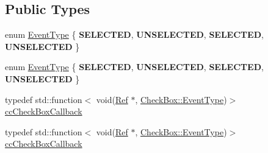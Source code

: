 \subsection*{Public Types}
\begin{DoxyCompactItemize}
\item 
enum \hyperlink{classui_1_1CheckBox_a72686e7bedf29fe84c5bc952be237b50}{Event\+Type} \{ {\bfseries S\+E\+L\+E\+C\+T\+ED}, 
{\bfseries U\+N\+S\+E\+L\+E\+C\+T\+ED}, 
{\bfseries S\+E\+L\+E\+C\+T\+ED}, 
{\bfseries U\+N\+S\+E\+L\+E\+C\+T\+ED}
 \}
\item 
enum \hyperlink{classui_1_1CheckBox_a72686e7bedf29fe84c5bc952be237b50}{Event\+Type} \{ {\bfseries S\+E\+L\+E\+C\+T\+ED}, 
{\bfseries U\+N\+S\+E\+L\+E\+C\+T\+ED}, 
{\bfseries S\+E\+L\+E\+C\+T\+ED}, 
{\bfseries U\+N\+S\+E\+L\+E\+C\+T\+ED}
 \}
\item 
typedef std\+::function$<$ void(\hyperlink{classRef}{Ref} $\ast$, \hyperlink{classui_1_1CheckBox_a72686e7bedf29fe84c5bc952be237b50}{Check\+Box\+::\+Event\+Type})$>$ \hyperlink{classui_1_1CheckBox_ad210762967d1b444f5cf94f5e7450c56}{cc\+Check\+Box\+Callback}
\item 
typedef std\+::function$<$ void(\hyperlink{classRef}{Ref} $\ast$, \hyperlink{classui_1_1CheckBox_a72686e7bedf29fe84c5bc952be237b50}{Check\+Box\+::\+Event\+Type})$>$ \hyperlink{classui_1_1CheckBox_ad210762967d1b444f5cf94f5e7450c56}{cc\+Check\+Box\+Callback}
\end{DoxyCompactItemize}
